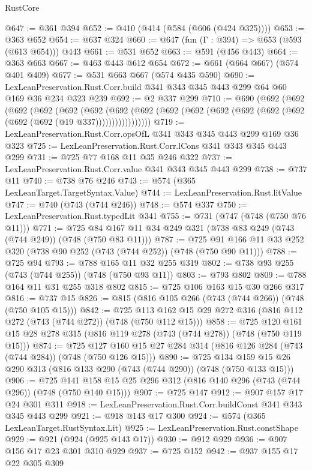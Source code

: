 \begin{lexlean}{RustCore}
\begin{coremodule}
@647 := @361 @394
@652 := @410 (@414 (@584 (@606 (@424 @325))))
@653 := @363 @652
@654 := @637 @324
@660 := @647 (fun (Γ : @394) => @653 (@593 (@613 @654))) @443
@661 := @531 @652
@663 := @591 (@456 @443)
@664 := @363 @663
@667 := @463 @443 @612 @654
@672 := @661 (@664 @667) (@574 @401 @409)
@677 := @531 @663 @667 (@574 @435 @590)
@690 := LexLeanPreservation.Rust.Corr.build @341 @343 @345 @443 @299 @64 @60 @169 @36 @234 @323 @239
@692 := @2 @337 @299
@710 := @690
    (@692
      (@692
        (@692
          (@692
            (@692
              (@692
                (@692
                  (@692 (@692 (@692 (@692 (@692 (@692 (@692 (@692 (@692 (@19 @337)))))))))))))))))
@719 := LexLeanPreservation.Rust.Corr.opsOfL @341 @343 @345 @443 @299 @169 @36 @323
@725 := LexLeanPreservation.Rust.Corr.lCons @341 @343 @345 @443 @299
@731 := @725 @77 @168 @11 @35 @246 @322
@737 := LexLeanPreservation.Rust.Corr.value @341 @343 @345 @443 @299
@738 := @737 @11
@740 := @738 @76 @246
@743 := @574 (@365 LexLeanTarget.TargetSyntax.Value)
@744 := LexLeanPreservation.Rust.litValue
@747 := @740 (@743 (@744 @246))
@748 := @574 @337
@750 := LexLeanPreservation.Rust.typedLit @341
@755 := @731 (@747 (@748 (@750 @76 @11)))
@771 := @725 @84 @167 @11 @34 @249 @321 (@738 @83 @249 (@743 (@744 @249)) (@748 (@750 @83 @11)))
@787 := @725 @91 @166 @11 @33 @252 @320 (@738 @90 @252 (@743 (@744 @252)) (@748 (@750 @90 @11)))
@788 := @725 @94
@793 := @788 @165 @11 @32 @255 @319
@802 := @738 @93 @255 (@743 (@744 @255)) (@748 (@750 @93 @11))
@803 := @793 @802
@809 := @788 @164 @11 @31 @255 @318 @802
@815 := @725 @106 @163 @15 @30 @266 @317
@816 := @737 @15
@826 := @815 (@816 @105 @266 (@743 (@744 @266)) (@748 (@750 @105 @15)))
@842 := @725 @113 @162 @15 @29 @272 @316 (@816 @112 @272 (@743 (@744 @272)) (@748 (@750 @112 @15)))
@858 := @725 @120 @161 @15 @28 @278 @315 (@816 @119 @278 (@743 (@744 @278)) (@748 (@750 @119 @15)))
@874 := @725 @127 @160 @15 @27 @284 @314 (@816 @126 @284 (@743 (@744 @284)) (@748 (@750 @126 @15)))
@890 := @725 @134 @159 @15 @26 @290 @313 (@816 @133 @290 (@743 (@744 @290)) (@748 (@750 @133 @15)))
@906 := @725 @141 @158 @15 @25 @296 @312 (@816 @140 @296 (@743 (@744 @296)) (@748 (@750 @140 @15)))
@907 := @725 @147
@912 := @907 @157 @17 @24 @301 @311
@918 := LexLeanPreservation.Rust.Corr.buildConst @341 @343 @345 @443 @299
@921 := @918 @143 @17 @300
@924 := @574 (@365 LexLeanTarget.RustSyntax.Lit)
@925 := LexLeanPreservation.Rust.constShape
@929 := @921 (@924 (@925 @143 @17))
@930 := @912 @929
@936 := @907 @156 @17 @23 @301 @310 @929
@937 := @725 @152
@942 := @937 @155 @17 @22 @305 @309

\end{coremodule}
\end{lexlean}
